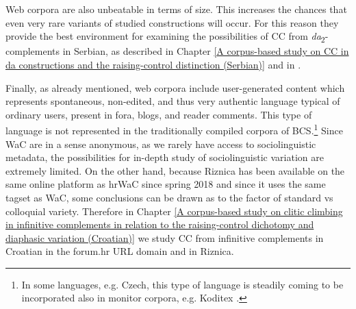 Web corpora are also unbeatable in terms of size. This increases the chances that even very rare variants of studied constructions will occur. For this reason they provide the best environment for examining the possibilities of CC from \textit{da}\textsubscript{2}-complements in Serbian, as described in Chapter \ref{A corpus-based study on CC in da constructions and the raising-control distinction (Serbian)} and in \citet*{JHK17b}.

Finally, as already mentioned, web corpora include user-generated content which represents spontaneous, non-edited, and thus very authentic language typical of ordinary users, present in fora, blogs, and reader comments. This type of language is not represented in the traditionally compiled corpora of BCS.\footnote{In some languages, e.g. Czech, this type of language is  steadily coming to be incorporated also in monitor corpora, e.g. Koditex \citep{Zasina18}.} Since WaC are in a sense anonymous, as we rarely have access to sociolinguistic metadata, the possibilities for in-depth study of sociolinguistic variation are extremely limited. On the other hand, because Riznica has been available on the same online platform as hrWaC since spring 2018 and since it uses the same tagset as WaC, some conclusions can be drawn as to the factor of standard vs colloquial variety. Therefore in Chapter \ref{A corpus-based study on clitic climbing in infinitive complements in relation to the raising-control dichotomy and diaphasic variation (Croatian)} we study CC from infinitive complements in Croatian in the forum.hr URL domain and in Riznica.
